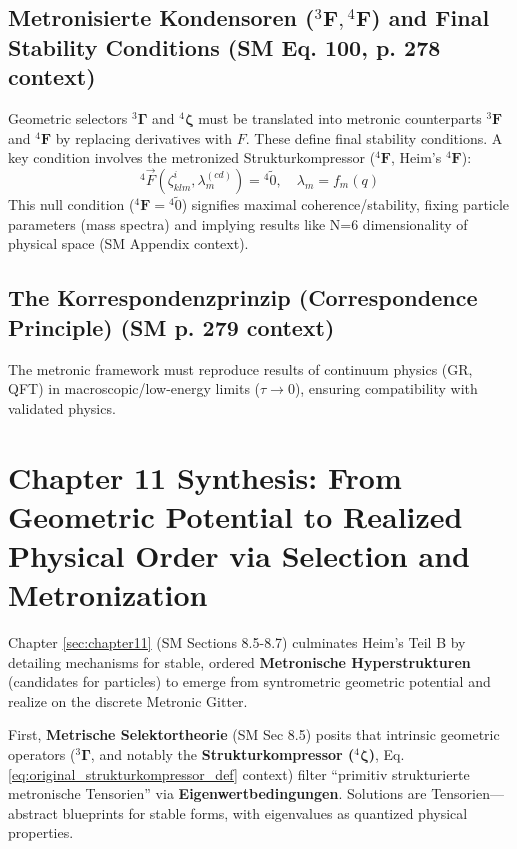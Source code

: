 \documentclass[
    12pt,              %
    a4paper,           %
    headings=normal,   %
    twoside=true,      %
    BCOR=8mm,          %
]{scrbook}
\newcommand{\q}[1]{\enquote{#1}}
\newcommand{\fundamentalkondensor}{{}^3\bm{\Gamma}}
\newcommand{\metron}{\tau}
\newcommand{\strukturkompressor}{{}^4\bm{\zeta}}
\newcommand{\metronisiertekondensor}[1]{{}^{#1}\mathbf{F}}
\begin{document}
\subsection{Metronisierte Kondensoren (\(\metronisiertekondensor{3}, \metronisiertekondensor{4}\)) and Final Stability Conditions (SM Eq. 100, p. 278 context)}
\label{sec:ch11_3_4_metronisierte_kondensoren_stability}
Geometric selectors \(\fundamentalkondensor\) and \(\strukturkompressor\) must be translated into metronic counterparts \(\metronisiertekondensor{3}\) and \(\metronisiertekondensor{4}\) by replacing derivatives with \(F\).
These define final stability conditions. A key condition involves the metronized Strukturkompressor (\(\metronisiertekondensor{4}\), Heim's \({}^4\mathbf{F}\)):
\begin{equation} \label{eq:original_final_stability_condition} %
{}^{4}\vec{F}(\zeta^i_{klm}, \lambda_m^{(cd)}) = {}^{4}\tilde{0}, \quad \lambda_m = f_m(q)
\end{equation}
This null condition (\(\metronisiertekondensor{4} = {}^{4}\tilde{0}\)) signifies maximal coherence/stability, fixing particle parameters (mass spectra) and implying results like N=6 dimensionality of physical space (SM Appendix context).

\subsection{The Korrespondenzprinzip (Correspondence Principle) (SM p. 279 context)}
\label{sec:ch11_3_5_korrespondenzprinzip}
The metronic framework must reproduce results of continuum physics (GR, QFT) in macroscopic/low-energy limits (\(\metron \to 0\)), ensuring compatibility with validated physics.

\section{Chapter 11 Synthesis: From Geometric Potential to Realized Physical Order via Selection and Metronization}
\label{sec:ch11_4_synthesis}

Chapter \ref{sec:chapter11} (SM Sections 8.5-8.7) culminates Heim's Teil B by detailing mechanisms for stable, ordered \textbf{Metronische Hyperstrukturen} (candidates for particles) to emerge from syntrometric geometric potential and realize on the discrete Metronic Gitter.

First, \textbf{Metrische Selektortheorie} (SM Sec 8.5) posits that intrinsic geometric operators (\(\fundamentalkondensor\), and notably the \textbf{Strukturkompressor (\(\strukturkompressor\))}, Eq. \eqref{eq:original_strukturkompressor_def} context) filter \q{primitiv strukturierte metronische Tensorien} via \textbf{Eigenwertbedingungen}. Solutions are Tensorien—abstract blueprints for stable forms, with eigenvalues as quantized physical properties.
\end{document}

